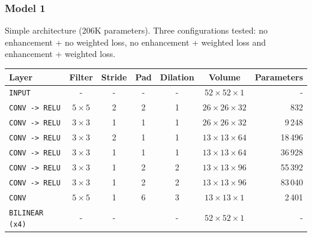 \documentclass{beamer}
\begin{document}
	\begin{frame}
	    \frametitle{Model 1}
	    Simple architecture (206K parameters). Three configurations tested: no enhancement + no weighted loss, no enhancement + weighted loss and enhancement + weighted loss.
	    
	    \footnotesize
	    \begin{table}
	        \centering
	        \begin{tabular}{lcccccr}
	        \hline
	        \textbf{Layer} & \textbf{Filter} & \textbf{Stride} & \textbf{Pad} & \textbf{Dilation} & \textbf{Volume} & \textbf{Parameters} \\
	        \hline
	        \texttt{INPUT}	&- & -	& - & - & $52 \times 52 \times 1$ & -\\
	        \texttt{CONV -> RELU}	& $5 \times 5$ & 2 & 2 & 1 & $26 \times 26 \times 32$ & 832\\
	        \texttt{CONV -> RELU}	& $3 \times 3$ & 1 & 1 & 1 & $26 \times 26 \times 32$ & 9\,248\\
	        \texttt{CONV -> RELU}	& $3 \times 3$ & 2 & 1 & 1 & $13 \times 13 \times 64$ & 18\,496\\
	        \texttt{CONV -> RELU}	& $3 \times 3$ & 1 & 1 & 1 & $13 \times 13 \times 64$ & 36\,928\\
	        \texttt{CONV -> RELU}	& $3 \times 3$ & 1 & 2 & 2 & $13 \times 13 \times 96$ & 55\,392\\
	        \texttt{CONV -> RELU}	& $3 \times 3$ & 1 & 2 & 2 & $13 \times 13 \times 96$ & 83\,040\\
	        \texttt{CONV}			& $5 \times 5$ & 1 & 6 & 3 & $13 \times 13 \times 1$ & 2\,401\\
	        \texttt{BILINEAR (x4)}	& - & - && - & $52 \times 52 \times 1$ & -\\
	        \hline
	        \end{tabular}
        \end{table} %
	\end{frame}
	
\end{document}
